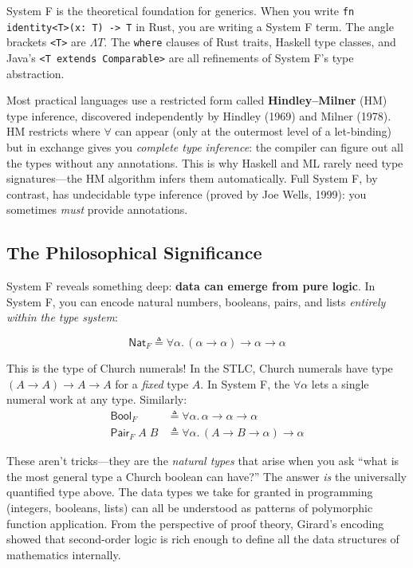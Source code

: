 \documentclass[11pt,a4paper]{article}
\theoremstyle{definition}
\newcommand{\Lam}{\Lambda}
\begin{document}
\begin{intuition}
System F is the theoretical foundation for generics. When you write
\texttt{fn identity<T>(x: T) -> T} in Rust, you are writing a System F term.
The angle brackets \texttt{<T>} are $\Lam T$. The \texttt{where} clauses of
Rust traits, Haskell type classes, and Java's \texttt{<T extends Comparable>}
are all refinements of System F's type abstraction.

Most practical languages use a restricted form called \textbf{Hindley--Milner}
(HM) type inference, discovered independently by Hindley (1969) and Milner
(1978). HM restricts where $\forall$ can appear (only at the outermost level of
a let-binding) but in exchange gives you \emph{complete type inference}: the
compiler can figure out all the types without any annotations. This is why
Haskell and ML rarely need type signatures---the HM algorithm infers them
automatically. Full System F, by contrast, has undecidable type inference
(proved by Joe Wells, 1999): you sometimes \emph{must} provide annotations.
\end{intuition}

\subsection{The Philosophical Significance}

System F reveals something deep: \textbf{data can emerge from pure logic}.
In System F, you can encode natural numbers, booleans, pairs, and lists
\emph{entirely within the type system}:

\[
  \textsf{Nat}_F \triangleq \forall\alpha.\, (\alpha \to \alpha) \to \alpha \to \alpha
\]

This is the type of Church numerals! In the STLC, Church numerals have
type $(A \to A) \to A \to A$ for a \emph{fixed} type $A$. In System F, the
$\forall\alpha$ lets a single numeral work at any type. Similarly:
\begin{align*}
  \textsf{Bool}_F &\triangleq \forall\alpha.\, \alpha \to \alpha \to \alpha \\
  \textsf{Pair}_F\;A\;B &\triangleq \forall\alpha.\, (A \to B \to \alpha) \to \alpha
\end{align*}

These aren't tricks---they are the \emph{natural types} that arise when you ask
``what is the most general type a Church boolean can have?'' The answer
\emph{is} the universally quantified type above. The data types we take for
granted in programming (integers, booleans, lists) can all be understood as
patterns of polymorphic function application. From the perspective of proof
theory, Girard's encoding showed that second-order logic is rich enough to
define all the data structures of mathematics internally.
\end{document}
